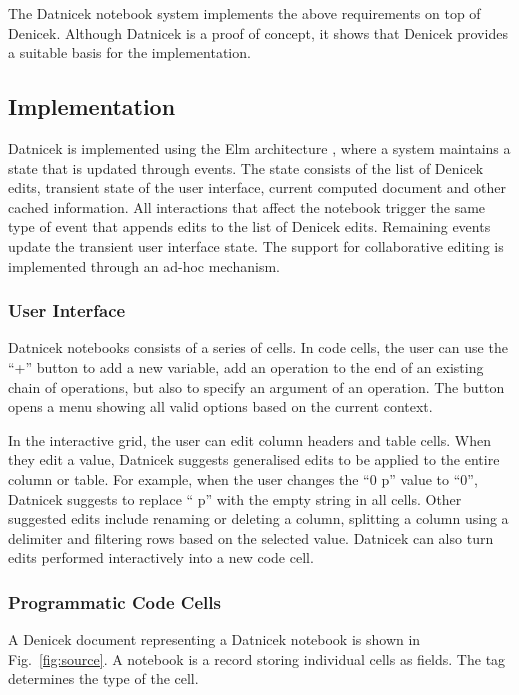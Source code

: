 \documentclass[sigconf,anonymous,screen]{acmart}
\begin{document}
\noindent
The Datnicek notebook system implements the above requirements on top of Denicek.
Although Datnicek is a proof of concept, it shows that Denicek provides a suitable basis
for the implementation.


\subsection{Implementation}
Datnicek is implemented using the Elm architecture \cite{fowler-2020-mvu},
where a system maintains a state that is updated through events. The state consists
of the list of Denicek edits, transient state of the user interface, current computed document
and other cached information. All interactions that affect the notebook trigger
the same type of event that appends edits to the list of Denicek edits. Remaining events
update the transient user interface state. The support for collaborative editing is
implemented through an ad-hoc mechanism.

\subsubsection*{User Interface}
Datnicek notebooks consists of a series of cells. In code cells, the user can
use the ``+'' button to add a new variable, add an operation to the end of an existing chain
of operations, but also to specify an argument of an operation. The button opens
a menu showing all valid options based on the current context.

In the interactive grid, the user can edit column headers and table cells. When they edit
a value, Datnicek suggests generalised edits to be applied to the entire
column or table. For example, when the user changes the ``0 p'' value to ``0'', Datnicek
suggests to replace `` p'' with the empty string in all cells. Other suggested edits include renaming
or deleting a column, splitting a column using a delimiter and filtering rows based on the selected
value. Datnicek can also turn edits performed interactively into a new code cell.

\subsubsection*{Programmatic Code Cells}
A Denicek document representing a Datnicek notebook is shown in Fig.~\ref{fig:source}. A
notebook is a record storing individual cells as fields. The tag determines the type of the cell.
\end{document}
